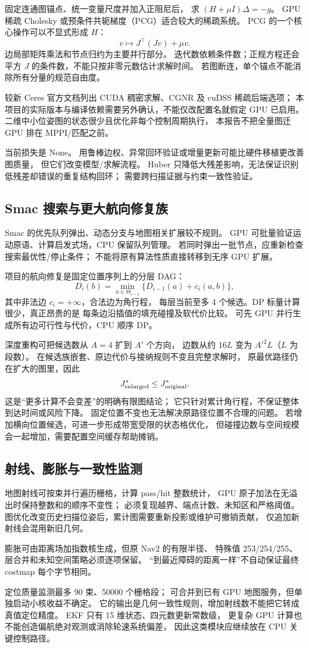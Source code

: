 固定连通图锚点、统一变量尺度并加入正阻尼后，
求 $(H+\mu I)\Delta=-g$。
GPU 稀疏 Cholesky 或预条件共轭梯度（PCG）适合较大的稀疏系统。
PCG 的一个核心操作可以不显式形成 $H$：
\[
v\longmapsto J^\top(Jv)+\mu v.
\]
边局部矩阵乘法和节点归约为主要并行部分。
迭代数依赖条件数；正规方程还会平方 $J$ 的条件数，不能只按非零元数估计求解时间。
若图断连，单个锚点不能消除所有分量的规范自由度。

较新 Ceres 官方文档列出 CUDA 稠密求解、CGNR 及 cuDSS 稀疏后端选项\cite{ceresnew}；
本项目的实际版本与编译依赖需要另外确认，不能仅改配置名就假定 GPU 已启用。
二维中小位姿图的状态很少且优化非每个控制周期执行，
本报告不把全量图迁 GPU 排在 MPPI/匹配之前。

当前损失是 None。
用鲁棒边权、异常回环验证或增量更新可能比硬件移植更改善图质量，
但它们改变模型/求解流程。
Huber 只降低大残差影响，无法保证识别低残差却错误的重复结构回环；
需要跨扫描证据与约束一致性验证。

\subsection{Smac 搜索与更大航向修复族}
Smac 的优先队列弹出、动态分支与地图相关扩展较不规则。
GPU 可批量验证运动原语、计算启发式场，CPU 保留队列管理。
若同时弹出一批节点，应重新检查搜索最优性/停止条件；
不能将原有算法性质直接转移到无序 GPU 扩展。

项目的航向修复是固定位置序列上的分层 DAG：
\[
D_i(b)=\min_{a\in\Theta_{i-1}}
\{D_{i-1}(a)+c_i(a,b)\},
\]
其中非法边 $c_i=+\infty$，合法边为角行程，
每层当前至多 4 个候选。DP 标量计算很少，真正昂贵的是
每条边沿插值的填充碰撞及软代价比较。
可先 GPU 并行生成所有边可行性与代价，CPU 顺序 DP。

深度重构可把候选数从 $A=4$ 扩到 $A'$ 个方向，
边数从约 $16L$ 变为 $A'^2L$（$L$ 为段数）。
在候选族嵌套、原边代价与接纳规则不变且完整求解时，
原最优路径仍在扩大的图里，因此
\[
J^*_{\rm enlarged}\le J^*_{\rm original}.
\]
这是“更多计算不会变差”的明确有限图结论；
它只针对累计角行程，不保证整体到达时间或风险下降。
固定位置不变也无法解决原路径位置不合理的问题。
若增加横向位置候选，可进一步形成带宽受限的状态格优化，
但碰撞边数与空间规模会一起增加，需要配置空间缓存帮助摊销。

\subsection{射线、膨胀与一致性监测}
地图射线可按束并行遍历栅格，计算 pass/hit 整数统计，
GPU 原子加法在无溢出时保持整数和的顺序不变性；
必须复现越界、端点计数、未知区和严格阈值。
图优化改变历史扫描位姿后，累计图需要重新投影或维护可撤销贡献，
仅追加新射线会混用新旧几何。

膨胀可由距离场加指数核生成，但原 Nav2 的有限半径、
特殊值 253/254/255、层合并和未知空间策略必须逐项保留。
“到最近障碍的距离一样”不自动保证最终 costmap 每个字节相同。

定位质量监测最多 90 束、50000 个栅格段；
可合并到已有 GPU 地图服务，但单独启动小核收益不确定。
它的输出是几何一致性规则，增加射线数不能把它转成真值定位精度。
EKF 只有 15 维状态、四元数更新常数级，
更复杂 GPU 计算也不能创造偏航绝对观测或消除轮速系统偏差，
因此这类模块应继续放在 CPU 关键控制路径。
